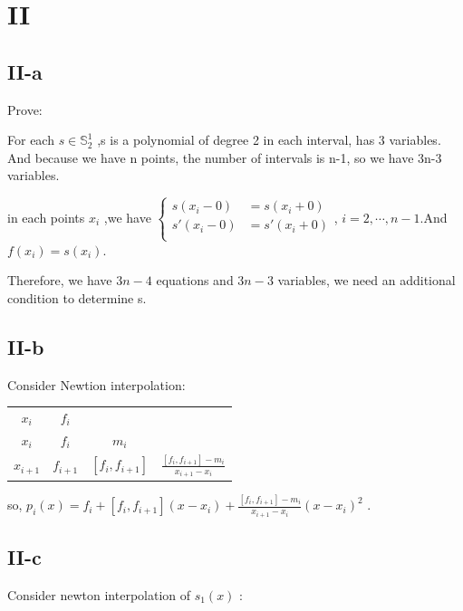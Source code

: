 \documentclass[a4paper]{article}
\begin{document}
\section*{II}
\subsection*{II-a}
Prove:

For each $s \in \mathbb{S}_{2}^{1}$ ,s is a polynomial of degree 2 in each interval, has 3 variables. And
because we have n points, the number of intervals is n-1, so we have 3n-3 variables.

in each points $x_{i}$ ,we have 
$\left\{
    \begin{array}{rl}
    s(x_{i}-0) &= s(x_{i}+0)\\
    s'(x_{i}-0) &= s'(x_{i}+0)\\
    \end{array}
\right.$, $i = 2,\cdots, n-1$.And $f(x_{i}) = s(x_{i})$.

Therefore, we have $3n-4$ equations and $3n-3$ variables, we need an additional condition to determine s.

\subsection*{II-b}
Consider Newtion interpolation:

\begin{table}[h]
    \centering
    \begin{tabular}{c|ccc}
        
        $x_{i}$ &$f_{i}$ & & \\
        
        $x_{i}$ &$f_{i}$ &$m_{i}$ & \\
        
        $x_{i+1}$ &$f_{i+1}$ &$[f_{i}, f_{i+1}]$ &$\frac{[f_{i}, f_{i+1}] - m_{i}}{x_{i+1}-x_{i}}$  \\
        
    \end{tabular} 
\end{table}
so, $p_{i}(x) = f_{i} + [f_{i}, f_{i+1}](x-x_{i}) + \frac{[f_{i}, f_{i+1}] - m_{i}}{x_{i+1}-x_{i}}(x-x_{i})^{2}$ .

\subsection*{II-c}
Consider newton interpolation of $s_{1}(x)$ :
\end{document}
